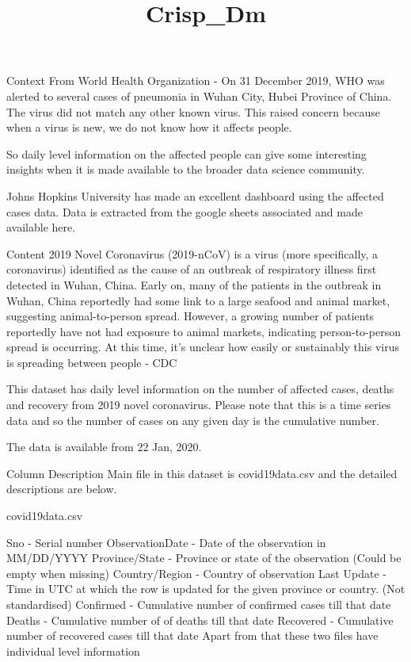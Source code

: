 \documentclass[11pt]{article}
\title{Crisp\_Dm}
\begin{document}
    
    
    \maketitle
    
    

    Context
From World Health Organization - On 31 December 2019, WHO was alerted to several cases of pneumonia in Wuhan City, Hubei Province of China. The virus did not match any other known virus. This raised concern because when a virus is new, we do not know how it affects people.

So daily level information on the affected people can give some interesting insights when it is made available to the broader data science community.

Johns Hopkins University has made an excellent dashboard using the affected cases data. Data is extracted from the google sheets associated and made available here.


Content
2019 Novel Coronavirus (2019-nCoV) is a virus (more specifically, a coronavirus) identified as the cause of an outbreak of respiratory illness first detected in Wuhan, China. Early on, many of the patients in the outbreak in Wuhan, China reportedly had some link to a large seafood and animal market, suggesting animal-to-person spread. However, a growing number of patients reportedly have not had exposure to animal markets, indicating person-to-person spread is occurring. At this time, it’s unclear how easily or sustainably this virus is spreading between people - CDC

This dataset has daily level information on the number of affected cases, deaths and recovery from 2019 novel coronavirus. Please note that this is a time series data and so the number of cases on any given day is the cumulative number.

The data is available from 22 Jan, 2020.

Column Description
Main file in this dataset is covid19data.csv and the detailed descriptions are below.

covid19data.csv

Sno - Serial number
ObservationDate - Date of the observation in MM/DD/YYYY
Province/State - Province or state of the observation (Could be empty when missing)
Country/Region - Country of observation
Last Update - Time in UTC at which the row is updated for the given province or country. (Not standardised)
Confirmed - Cumulative number of confirmed cases till that date
Deaths - Cumulative number of of deaths till that date
Recovered - Cumulative number of recovered cases till that date
Apart from that these two files have individual level information
\end{document}
